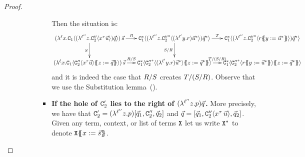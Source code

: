\begin{proof}
\begin{enumerate}
\begin{enumerate}
\begin{enumerate}
\begin{itemize}
        Then the situation is:
        {\footnotesize
        \[
          \xymatrix@C=.5cm{
            (\lamp{\lab}{\var}{\con_1\of{  (\lamp{\labthree}{\varthree}{\con''_2\of{\var^{\typ}\ls{\tmthree}} })\ls{\tmsix} }})\,\ls{\tmtwo}
            \ar[r]^-{\redex}
            \ar[d]_-{\redextwo}
          &
            \con_1^*\of{  (\lamp{\labthree}{\varthree}{{\con''_2}^*\of{(\lamp{\labtwo}{\vartwo}{\tmfour})\ls{\tmthree}^*} })\ls{\tmsix}^* }
            \ar[d]_-{\redextwo/\redex}
            \ar[r]^-{\redexthree}
          &
            \con_1^*\of{  (\lamp{\labthree}{\varthree}{{\con''_2}^*\of{ \tmfour\sub{\vartwo}{\ls{\tmthree}^*} } })\ls{\tmsix}^* }
          \\
            (\lamp{\lab}{\var}{\con_1\of{  \con''_2\of{\var^{\typ}\ls{\tmthree}} \sub{\varthree}{\ls{\tmsix}} }})\,\ls{\tmtwo}
            \ar[r]^-{\redex/\redextwo}
          &
            \con_1^*\of{  {\con''_2}^*\of{(\lamp{\labtwo}{\vartwo}{\tmfour})\ls{\tmthree}^*} \sub{\varthree}{\ls{\tmsix}^*} }
            \ar[r]^-{\redexthree/(\redextwo/\redex)}
          &
            \con_1^*\of{  {\con''_2}^*\of{ \tmfour\sub{\vartwo}{\ls{\tmthree}^*} } \sub{\varthree}{\ls{\tmsix}^*} }
          }
        \]}
        and it is indeed the case that $R/S$ creates $T/(S/R)$.
        Observe that we use the Substitution lemma~().
      \item {\bf If the hole of $\mathtt{C}'_2$ lies to the right of $(\lambda^{\ell''} z. p)\vec{q}$.}
        More precisely, we have that $\mathtt{C}'_2 = (\lambda^{\ell''} z. p)[\vec{q}_1,\mathtt{C}''_2,\vec{q}_2]$
        and $\vec{q} = [\vec{q}_1,\mathtt{C}''_2\langle x^\tau\,\vec{u}\rangle,\vec{q}_2]$.
        Given any term, context, or list of terms $\mathtt{X}$ let us write $\mathtt{X}^*$ to denote $\mathtt{X}\{\!\!\{x := \vec{s}\}\!\!\}$.


\end{itemize}
\end{enumerate}
\end{enumerate}
\end{enumerate}
\end{proof}
